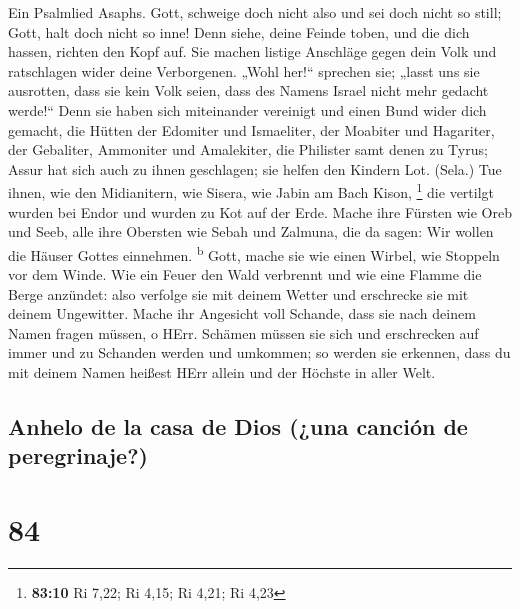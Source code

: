  Ein Psalmlied Asaphs.  Gott, schweige doch
nicht also und sei doch nicht so still; Gott, halt doch nicht so inne!
 Denn siehe, deine Feinde toben, und die dich hassen,
richten den Kopf auf.  Sie machen listige Anschläge gegen
dein Volk und ratschlagen wider deine Verborgenen.  „Wohl
her!{}`` sprechen sie; „lasst uns sie ausrotten, dass sie kein Volk
seien, dass des Namens Israel nicht mehr gedacht werde!{}``
 Denn sie haben sich miteinander vereinigt und einen Bund
wider dich gemacht,  die Hütten der Edomiter und
Ismaeliter, der Moabiter und Hagariter,  der Gebaliter,
Ammoniter und Amalekiter, die Philister samt denen zu Tyrus;
 Assur hat sich auch zu ihnen geschlagen; sie helfen den
Kindern Lot. (Sela.)  Tue ihnen, wie den Midianitern, wie
Sisera, wie Jabin am Bach Kison, \footnote{\textbf{83:10} Ri 7,22; Ri
  4,15; Ri 4,21; Ri 4,23}  die vertilgt wurden bei Endor
und wurden zu Kot auf der Erde.  Mache ihre Fürsten wie
Oreb und Seeb, alle ihre Obersten wie Sebah und Zalmuna, 
die da sagen: Wir wollen die Häuser Gottes einnehmen.
\textsuperscript{b}  Gott, mache sie wie einen Wirbel,
wie Stoppeln vor dem Winde.  Wie ein Feuer den Wald
verbrennt und wie eine Flamme die Berge anzündet:  also
verfolge sie mit deinem Wetter und erschrecke sie mit deinem Ungewitter.
 Mache ihr Angesicht voll Schande, dass sie nach deinem
Namen fragen müssen, o HErr.  Schämen müssen sie sich und
erschrecken auf immer und zu Schanden werden und umkommen;
 so werden sie erkennen, dass du mit deinem Namen heißest
HErr allein und der Höchste in aller Welt.

\hypertarget{anhelo-de-la-casa-de-dios-una-canciuxf3n-de-peregrinaje}{%
\subsection{Anhelo de la casa de Dios (¿una canción de
peregrinaje?)}\label{anhelo-de-la-casa-de-dios-una-canciuxf3n-de-peregrinaje}}

\hypertarget{section-83}{%
\section{84}\label{section-83}}

